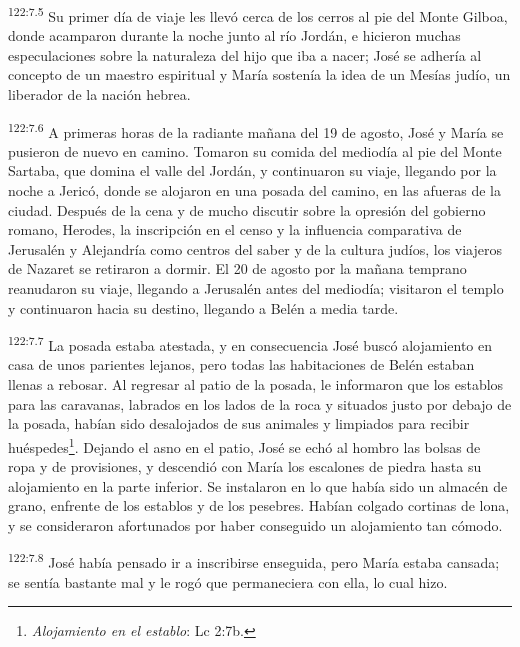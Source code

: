 \par 
\textsuperscript{122:7.5} Su primer día de viaje les llevó cerca de los cerros al pie del Monte Gilboa, donde acamparon durante la noche junto al río Jordán, e hicieron muchas especulaciones sobre la naturaleza del hijo que iba a nacer; José se adhería al concepto de un maestro espiritual y María sostenía la idea de un Mesías judío, un liberador de la nación hebrea.

\par 
\textsuperscript{122:7.6} A primeras horas de la radiante mañana del 19 de agosto, José y María se pusieron de nuevo en camino. Tomaron su comida del mediodía al pie del Monte Sartaba, que domina el valle del Jordán, y continuaron su viaje, llegando por la noche a Jericó, donde se alojaron en una posada del camino, en las afueras de la ciudad. Después de la cena y de mucho discutir sobre la opresión del gobierno romano, Herodes, la inscripción en el censo y la influencia comparativa de Jerusalén y Alejandría como centros del saber y de la cultura judíos, los viajeros de Nazaret se retiraron a dormir. El 20 de agosto por la mañana temprano reanudaron su viaje, llegando a Jerusalén antes del mediodía; visitaron el templo y continuaron hacia su destino, llegando a Belén a media tarde.

\par 
\textsuperscript{122:7.7} La posada estaba atestada, y en consecuencia José buscó alojamiento en casa de unos parientes lejanos, pero todas las habitaciones de Belén estaban llenas a rebosar. Al regresar al patio de la posada, le informaron que los establos para las caravanas, labrados en los lados de la roca y situados justo por debajo de la posada, habían sido desalojados de sus animales y limpiados para recibir huéspedes\footnote{\textit{Alojamiento en el establo}: Lc 2:7b.}. Dejando el asno en el patio, José se echó al hombro las bolsas de ropa y de provisiones, y descendió con María los escalones de piedra hasta su alojamiento en la parte inferior. Se instalaron en lo que había sido un almacén de grano, enfrente de los establos y de los pesebres. Habían colgado cortinas de lona, y se consideraron afortunados por haber conseguido un alojamiento tan cómodo.

\par 
\textsuperscript{122:7.8} José había pensado ir a inscribirse enseguida, pero María estaba cansada; se sentía bastante mal y le rogó que permaneciera con ella, lo cual hizo.

